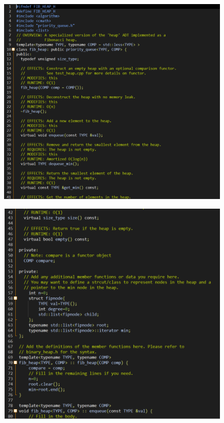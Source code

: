 \documentclass[12pt]{article}
\begin{document}
\begin{figure}[H]
\centering
\includegraphics[scale=0.6]{P13.png}
\end{figure}
\begin{figure}[H]
\centering
\includegraphics[scale=0.6]{P14.png}
\end{figure}
\end{document}

